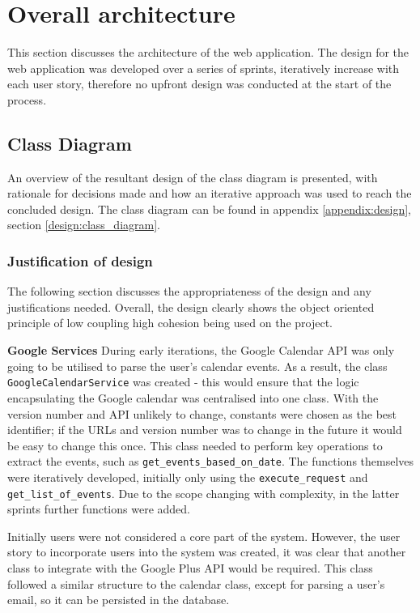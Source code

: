 \section{Overall architecture}
This section discusses the architecture of the web application. The design for the web application was developed over a series of sprints, iteratively increase with each user story, therefore no upfront design was conducted at the start of the process.

\subsection{Class Diagram}
\label{architecture:class}
An overview of the resultant design of the class diagram is presented, with rationale for decisions made and how an iterative approach was used to reach the concluded design. The class diagram can be found in appendix \ref{appendix:design}, section \ref{design:class_diagram}.

\subsubsection{Justification of design}
The following section discusses the appropriateness of the design and any justifications needed. Overall, the design clearly shows the object oriented principle of low coupling high cohesion being used on the project.

\noident
\textbf{Google Services}
\newline
During early iterations, the Google Calendar API was only going to be utilised to parse the user's calendar events. As a result, the class \texttt{GoogleCalendarService} was created - this would ensure that the logic encapsulating the Google calendar was centralised into one class. With the version number and API unlikely to change, constants were chosen as the best identifier; if the URLs and version number was to change in the future it would be easy to change this once. This class needed to perform key operations to extract the events, such as \texttt{get\_events\_based\_on\_date}. The functions themselves were iteratively developed, initially only using the \texttt{execute\_request} and \texttt{get\_list\_of\_events}. Due to the scope changing with complexity, in the latter sprints  further functions were added.

Initially users were not considered a core part of the system. However, the user story to incorporate users into the system was created, it was clear that another class to integrate with the Google Plus API would be required. This class followed a similar structure to the calendar class, except for parsing a user's email, so it can be persisted in the database.

